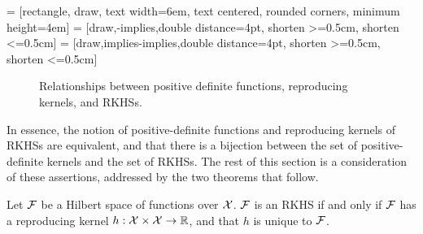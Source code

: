  = [rectangle, draw, text width=6em, text centered, rounded corners, minimum height=4em]
 = [draw,-implies,double distance=4pt, shorten >=0.5cm, shorten <=0.5cm]
 = [draw,implies-implies,double distance=4pt, shorten >=0.5cm, shorten <=0.5cm]

\vspace{0.5em}
\begin{figure}[H]
  \centering
  \caption[Relationship between p.d. functions, rep. kernels, and RKHSs]{Relationships between positive definite functions, reproducing kernels, and RKHSs.}
\end{figure}
\vspace{-0.5em}

In essence, the notion of positive-definite functions and reproducing kernels of RKHSs are equivalent, and that there is a bijection between the set of positive-definite kernels and the set of RKHSs.
The rest of this section is a consideration of these assertions, addressed by the two theorems that follow.

\begin{theorem}\label{thm:rkhsunique}
  Let ${\mathcal F}$ be a Hilbert space of functions over ${\mathcal X}$.
  ${\mathcal F}$ is an RKHS if and only if ${\mathcal F}$ has a reproducing kernel $h:{\mathcal X}\times{\mathcal X}\to\mathbb{R}$, and that $h$ is unique to ${\mathcal F}$.
\end{theorem}

